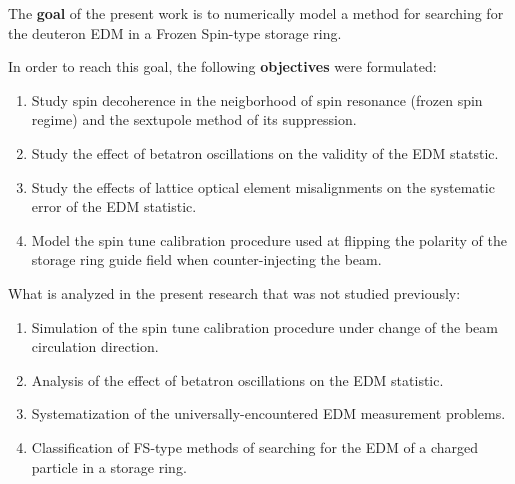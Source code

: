 The \textbf{goal} of the present work is to numerically model a method for searching for the deuteron EDM
in a Frozen Spin-type storage ring.

In order to reach this goal, the following \textbf{objectives} were formulated:
\begin{enumerate}[(1)]
  \item Study spin decoherence in the neigborhood of spin resonance (frozen spin regime) and the sextupole
  method of its suppression. 
  \item Study the effect of betatron oscillations on the validity of the EDM statstic.
  \item Study the effects of lattice optical element misalignments on the systematic error of the EDM statistic.
  \item Model the spin tune calibration procedure used at flipping the polarity of the storage ring guide field
  when counter-injecting the beam.
\end{enumerate}

What is analyzed in the present research that was not studied previously:
\begin{enumerate}[(1)]
  \item Simulation of the spin tune calibration procedure under change of the beam circulation direction. 
  \item Analysis of the effect of betatron oscillations on the EDM statistic.
  \item Systematization of the universally-encountered EDM measurement problems.
  \item Classification of FS-type methods of searching for the EDM of a charged particle in a storage ring.
\end{enumerate}

